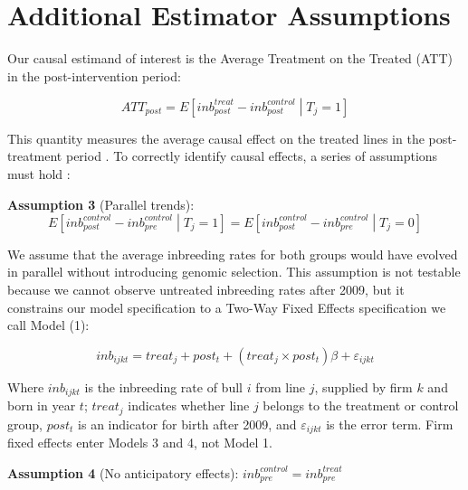\documentclass[12pt,letterpaper]{article}
\begin{document}

\section{Additional Estimator Assumptions}
\label{app:estimator}
Our causal estimand of interest is the Average Treatment on the Treated (ATT) in the post-intervention period:

\begin{equation*}
    ATT_{post}=E\left[inb_{post}^{treat}-inb_{post}^{control} \middle| T_{j}=1\right]
\end{equation*}

This quantity measures the average causal effect on the treated lines in the post-treatment period \citep{Roth2023}. To correctly identify causal effects, a series of assumptions must hold \citep{Sun2021}:

\medskip
\textbf{Assumption 3} (Parallel trends): 
\begin{equation*}
    E\left[inb_{post}^{control}-inb_{pre}^{control}\middle| T_{j}=1\right] = E\left[inb_{post}^{control}-inb_{pre}^{control} \middle| T_{j}=0\right]
\end{equation*}

We assume that the average inbreeding rates for both groups would have evolved in parallel without introducing genomic selection. This assumption is not testable because we cannot observe untreated inbreeding rates after 2009, but it constrains our model specification to a Two-Way Fixed Effects specification we call Model (1):

\begin{equation}
inb_{ijkt} = treat_{j}+post_{t}+(treat_{j}\times post_{t})\beta+\varepsilon_{ijkt}\tag{Model 1}
\end{equation}

Where $inb_{ijkt}$ is the inbreeding rate of bull $i$ from line $j$, supplied by firm $k$ and born in year $t$; $treat_{j}$ indicates whether line $j$ belongs to the treatment or control group, $post_{t}$ is an indicator for birth after 2009, and $\varepsilon_{ijkt}$ is the error term. Firm fixed effects enter Models 3 and 4, not Model 1. 

\medskip
\textbf{Assumption 4} (No anticipatory effects): $inb_{pre}^{control}=inb_{pre}^{treat}$
\end{document}
